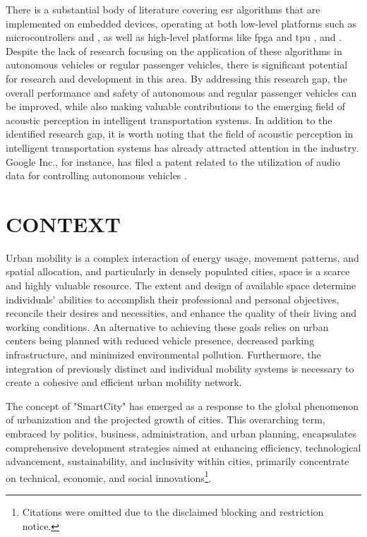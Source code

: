 There is a substantial body of literature covering \gls{esr} algorithms that are implemented on embedded devices, operating at both low-level platforms such as microcontrollers \cite{Abreha2014} and \cite{Nordby2019}, as well as high-level platforms like \gls{fpga} and \gls{tpu} \cite{Silva2019}, \cite{Vandendriessche2021} and \cite{Lhoest2021}. Despite the lack of research focusing on the application of these algorithms in autonomous vehicles or regular passenger vehicles, there is significant potential for research and development in this area. By addressing this research gap, the overall performance and safety of autonomous and regular passenger vehicles can be improved, while also making valuable contributions to the emerging field of acoustic perception in intelligent transportation systems. In addition to the identified research gap, it is worth noting that the field of acoustic perception in intelligent transportation systems has already attracted attention in the industry. Google Inc., for instance, has filed a patent related to the utilization of audio data for controlling autonomous vehicles \cite{Ferguson2014}.


\section{CONTEXT}
\label{sec:introduction_context}

Urban mobility is a complex interaction of energy usage, movement patterns, and spatial allocation, and particularly in densely populated cities, space is a scarce and highly valuable resource. The extent and design of available space determine individuals' abilities to accomplish their professional and personal objectives, reconcile their desires and necessities, and enhance the quality of their living and working conditions. An alternative to achieving these goals relies on urban centers being planned with reduced vehicle presence, decreased parking infrastructure, and minimized environmental pollution. Furthermore, the integration of previously distinct and individual mobility systems is necessary to create a cohesive and efficient urban mobility network.

The concept of "SmartCity" has emerged as a response to the global phenomenon of urbanization and the projected growth of cities. This overarching term, embraced by politics, business, administration, and urban planning, encapsulates comprehensive development strategies aimed at enhancing efficiency, technological advancement, sustainability, and inclusivity within cities, primarily concentrate on technical, economic, and social innovations\footnote{Citations were omitted due to the disclaimed blocking and restriction notice.}.

